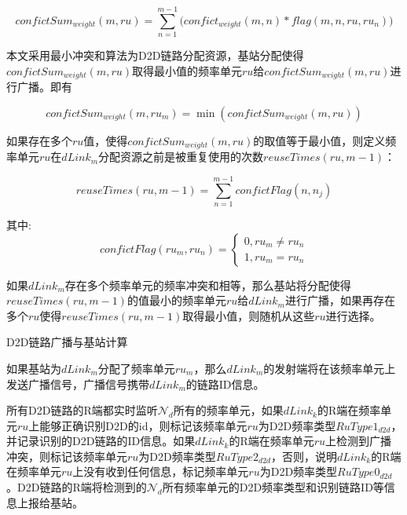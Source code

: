\documentclass[figurelist,tablelist,algorithmlist,nomlist,masters]{seuthesix}
\begin{document}
	\begin{equation}\label{eq2.1}
	confictSu{m_{weight}}(m,ru) = \sum\limits_{n = 1}^{m - 1} {(confic{t_{weight}}(m,n)} *flag(m,n,ru,r{u_n}))
	\end{equation}
	
	本文采用最小冲突和算法为D2D链路分配资源，基站分配使得$confictSu{m_{weight}}(m,ru)$取得最小值的频率单元$ru$给$confictSu{m_{weight}}(m,ru)$进行广播。即有
	
	\begin{equation}\label{eq2.1}
	confictSu{m_{weight}}(m,r{u_m}) = \min (confictSu{m_{weight}}(m,ru))
	\end{equation}
	
	如果存在多个$ru$值，使得$confictSu{m_{weight}}(m,ru)$的取值等于最小值，则定义频率单元$ru$在$dLink_m$分配资源之前是被重复使用的次数$reuseTimes(ru,m - 1)$：
	
	\begin{equation}\label{eq2.1}
	reuseTimes(ru,m - 1) = \sum\limits_{n = 1}^{m - 1} {confictFlag(n,{n_j})}
	\end{equation}
	
	其中:
	\begin{equation}\label{eq2.1}
	confictFlag(r{u_m},r{u_n}) = \left\{ \begin{array}{l}
	0,r{u_m} \ne r{u_n}\\
	1,r{u_m} = r{u_n}
	\end{array} \right.
	\end{equation}
	
	如果$dLink_m$存在多个频率单元的频率冲突和相等，那么基站将分配使得$reuseTimes(ru,m - 1)$的值最小的频率单元$ru$给$dLink_m$进行广播，如果再存在多个$ru$使得$reuseTimes(ru,m - 1)$取得最小值，则随机从这些$ru$进行选择。
	
	
	D2D链路广播与基站计算
	
	
	如果基站为$dLink_m$分配了频率单元$r{u_m}$，那么$dLink_m$的发射端将在该频率单元上发送广播信号，广播信号携带$dLink_m$的链路ID信息。
	
	所有D2D链路的R端都实时监听$\mathcal{N}_d$所有的频率单元，如果$dLink_k$的R端在频率单元$ru$上能够正确识别D2D的id，则标记该频率单元$ru$为D2D频率类型$RuType{1_{d2d}}$，并记录识别的D2D链路的ID信息。如果$dLink_k$的R端在频率单元$ru$上检测到广播冲突，则标记该频率单元$ru$为D2D频率类型$RuType{2_{d2d}}$，否则，说明$dLink_k$的R端在频率单元$ru$上没有收到任何信息，标记频率单元$ru$为D2D频率类型$RuType{0_{d2d}}$。D2D链路的R端将检测到的$\mathcal{N}_d$所有频率单元的D2D频率类型和识别链路ID等信息上报给基站。
	
\end{document}
